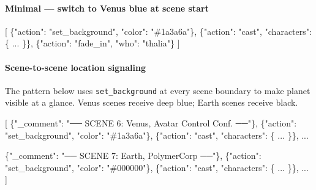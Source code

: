 \documentclass[
  11pt,
]{book}
\newenvironment{Shaded}{}{}
\newcommand{\DataTypeTok}[1]{\textcolor[rgb]{0.56,0.13,0.00}{#1}}
\newcommand{\FunctionTok}[1]{\textcolor[rgb]{0.02,0.16,0.49}{#1}}
\newcommand{\OtherTok}[1]{\textcolor[rgb]{0.00,0.44,0.13}{#1}}
\newcommand{\StringTok}[1]{\textcolor[rgb]{0.25,0.44,0.63}{#1}}
\begin{document}
\paragraph{Minimal --- switch to Venus blue at scene
start}\label{set-background-venus}

\begin{Shaded}
\begin{Highlighting}[]
\OtherTok{[}
  \FunctionTok{\{}\DataTypeTok{"action"}\FunctionTok{:} \StringTok{"set\_background"}\FunctionTok{,} \DataTypeTok{"color"}\FunctionTok{:} \StringTok{"\#1a3a6a"}\FunctionTok{\}}\OtherTok{,}
  \FunctionTok{\{}\DataTypeTok{"action"}\FunctionTok{:} \StringTok{"cast"}\FunctionTok{,} \DataTypeTok{"characters"}\FunctionTok{:} \FunctionTok{\{} \OtherTok{...} \FunctionTok{\}\}}\OtherTok{,}
  \FunctionTok{\{}\DataTypeTok{"action"}\FunctionTok{:} \StringTok{"fade\_in"}\FunctionTok{,} \DataTypeTok{"who"}\FunctionTok{:} \StringTok{"thalia"}\FunctionTok{\}}
\OtherTok{]}
\end{Highlighting}
\end{Shaded}

\paragraph{Scene-to-scene location
signaling}\label{set-background-location-signal}

The pattern below uses \texttt{set\_background} at every scene
boundary to make planet visible at a glance. Venus scenes receive
deep blue; Earth scenes receive black.

\begin{Shaded}
\begin{Highlighting}[]
\OtherTok{[}
  \FunctionTok{\{}\DataTypeTok{"\_comment"}\FunctionTok{:} \StringTok{"── SCENE 6: Venus, Avatar Control Conf. ──"}\FunctionTok{\}}\OtherTok{,}
  \FunctionTok{\{}\DataTypeTok{"action"}\FunctionTok{:} \StringTok{"set\_background"}\FunctionTok{,} \DataTypeTok{"color"}\FunctionTok{:} \StringTok{"\#1a3a6a"}\FunctionTok{\}}\OtherTok{,}
  \FunctionTok{\{}\DataTypeTok{"action"}\FunctionTok{:} \StringTok{"cast"}\FunctionTok{,} \DataTypeTok{"characters"}\FunctionTok{:} \FunctionTok{\{} \OtherTok{...} \FunctionTok{\}\}}\OtherTok{,}
  \OtherTok{...}

  \FunctionTok{\{}\DataTypeTok{"\_comment"}\FunctionTok{:} \StringTok{"── SCENE 7: Earth, PolymerCorp ──"}\FunctionTok{\}}\OtherTok{,}
  \FunctionTok{\{}\DataTypeTok{"action"}\FunctionTok{:} \StringTok{"set\_background"}\FunctionTok{,} \DataTypeTok{"color"}\FunctionTok{:} \StringTok{"\#000000"}\FunctionTok{\}}\OtherTok{,}
  \FunctionTok{\{}\DataTypeTok{"action"}\FunctionTok{:} \StringTok{"cast"}\FunctionTok{,} \DataTypeTok{"characters"}\FunctionTok{:} \FunctionTok{\{} \OtherTok{...} \FunctionTok{\}\}}\OtherTok{,}
  \OtherTok{...}
\OtherTok{]}
\end{Highlighting}
\end{Shaded}
\end{document}
